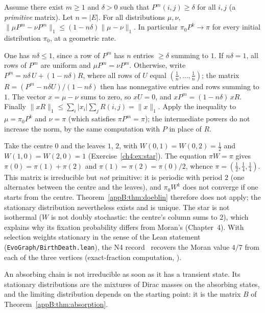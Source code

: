 \begin{theorem}\label{appB:thm:doeblin}
Assume there exist $m\ge1$ and $\delta>0$ such that $P^m(i,j)\ge\delta$ for all $i,j$ (a \emph{primitive} matrix). Let
$n=|E|$. For all distributions $\mu,\nu$, $\|\mu P^m-\nu P^m\|_1\le(1-n\delta)\|\mu-\nu\|_1$. In particular $\pi_0P^k\to\pi$
for every initial distribution $\pi_0$, at a geometric rate.
\end{theorem}

\begin{humanproof}
One has $n\delta\le1$, since a row of $P^m$ has $n$ entries $\ge\delta$ summing to $1$. If $n\delta=1$, all rows
of $P^m$ are uniform and $\mu P^m=\nu P^m$. Otherwise, write $P^m=n\delta\,U+(1-n\delta)R$, where all rows of $U$
equal $(\frac1n,\dots,\frac1n)$; the matrix $R=(P^m-n\delta U)/(1-n\delta)$ then has nonnegative entries and
rows summing to $1$. The vector $x=\mu-\nu$ sums to zero, so $xU=0$, and
$xP^m=(1-n\delta)\,xR$. Finally $\|xR\|_1\le\sum_i|x_i|\sum_jR(i,j)=\|x\|_1$. Apply the inequality to $\mu=\pi_0P^k$ and
$\nu=\pi$ (which satisfies $\pi P^m=\pi$); the intermediate powers do not increase the norm, by the same computation
with $P$ in place of $R$.
\end{humanproof}

\begin{example}\label{appB:ex:etoile}
Take the centre $0$ and the leaves $1$, $2$, with $W(0,1)=W(0,2)=\frac12$ and $W(1,0)=W(2,0)=1$ (Exercise~\ref{ch4:ex:star}).
The equation $\pi W=\pi$ gives $\pi(0)=\pi(1)+\pi(2)$ and $\pi(1)=\pi(2)=\pi(0)/2$, whence $\pi=(\frac12,\frac14,\frac14)$.
This matrix is irreducible but \emph{not} primitive: it is periodic with period $2$ (one alternates between the
centre and the leaves), and $\pi_0W^k$ does not converge if one starts from the centre. Theorem~\ref{appB:thm:doeblin}
therefore does not apply; the stationary distribution nevertheless exists and is unique. The star is not isothermal
($W$ is not doubly stochastic: the centre's column sums to $2$), which explains why its fixation probability differs
from Moran's (Chapter~4). With selection weights stationary in the sense of the Lean statement 
(\texttt{EvoGraph/BirthDeath.lean}), the N4 record~\cite{ch4:N4} recovers the Moran value $4/7$ from each
of the three vertices (exact-fraction computation, \tierX).
\end{example}

\begin{remark}
An absorbing chain is not irreducible as soon as it has a transient state. Its stationary distributions are the
mixtures of Dirac masses on the absorbing states, and the limiting distribution depends on the starting point: it is
the matrix $B$ of Theorem~\ref{appB:thm:absorption}.
\end{remark}

